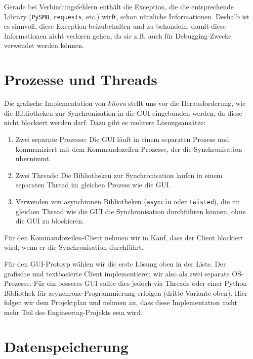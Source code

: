 \documentclass[a4paper]{article}
\let\oldsection\section
\renewcommand\section{\clearpage\oldsection}
\begin{document}
Gerade bei Verbindungsfehlern enthält die Exception, die die entsprechende
Library (\verb|PySMB|, \verb|requests|, etc.) wirft, schon nützliche Informationen. Deshalb
ist es sinnvoll, diese Exception beizubehalten und zu behandeln, damit diese
Informationen nicht verloren gehen, da sie z.B. auch für Debugging-Zwecke verwendet werden können.

\section{Prozesse und Threads}


Die grafische Implementation von \emph{kitovu} stellt uns vor die Herausforderung, wie die Bibliotheken zur Synchronisation in die GUI eingebunden werden, da diese nicht blockiert werden darf. Dazu gibt es mehrere Lösungsansätze:

\begin{enumerate}
	\item Zwei separate Prozesse: Die GUI läuft in einem separaten Prozess und kommuniziert mit dem Kommandozeilen-Prozesse, der die Synchronisation übernimmt.
	\item Zwei Threads: Die Bibliotheken zur Synchronisation laufen in einem separaten Thread im gleichen Prozess wie die GUI.
	\item Verwenden von asynchronen Bibliotheken (\verb|asyncio| oder \verb|twisted|), die im gleichen Thread wie die GUI die Synchronisation durchführen können, ohne die GUI zu blockieren.
\end{enumerate}

Für den Kommandozeilen-Client nehmen wir in Kauf, dass der Client blockiert wird, wenn er die Synchronisation durchführt.

Für den GUI-Protoyp wählen wir die erste Lösung oben in der Liste. Der grafische und textbasierte Client implementieren wir also als zwei separate OS-Prozesse. Für ein besseres GUI sollte dies jedoch via Threads oder einer Python-Bibliothek für asynchrone Programmierung erfolgen (dritte Variante oben). Hier folgen wir dem Projektplan und nehmen an, dass diese Implementation nicht mehr Teil des Engineering-Projekts sein wird.

\section{Datenspeicherung}
\end{document}
